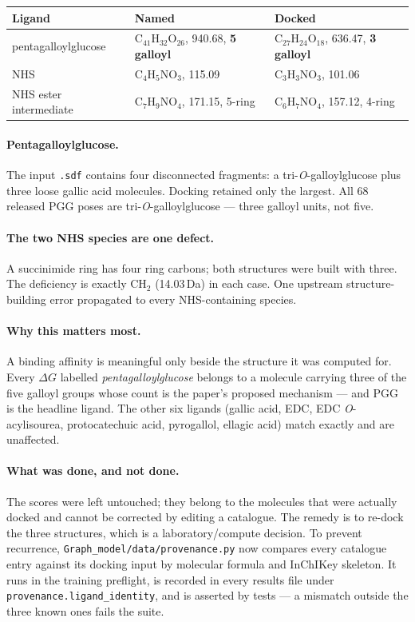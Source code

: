 \documentclass[11pt,a4paper]{article}
\newcommand{\ok}[1]{\textcolor{okgreen}{#1}}
\newcommand{\bad}[1]{\textcolor{badred}{#1}}
\newcommand{\code}[1]{\texttt{\small #1}}
\begin{document}
\begin{center}
\begin{tabular}{@{}lll@{}}
\toprule
\textbf{Ligand} & \textbf{Named} & \textbf{Docked} \\
\midrule
pentagalloylglucose & $\mathrm{C_{41}H_{32}O_{26}}$, 940.68, \textbf{5 galloyl}
  & \bad{$\mathrm{C_{27}H_{24}O_{18}}$, 636.47, \textbf{3 galloyl}} \\
NHS & $\mathrm{C_4H_5NO_3}$, 115.09
  & \bad{$\mathrm{C_3H_3NO_3}$, 101.06} \\
NHS ester intermediate & $\mathrm{C_7H_9NO_4}$, 171.15, 5-ring
  & \bad{$\mathrm{C_6H_7NO_4}$, 157.12, 4-ring} \\
\bottomrule
\end{tabular}
\end{center}

\paragraph{Pentagalloylglucose.} The input \code{.sdf} contains four
disconnected fragments: a tri-\emph{O}-galloylglucose plus three loose gallic
acid molecules. Docking retained only the largest. All 68 released PGG poses
are tri-\emph{O}-galloylglucose --- three galloyl units, not five.

\paragraph{The two NHS species are one defect.} A succinimide ring has four
ring carbons; both structures were built with three. The deficiency is exactly
$\mathrm{CH_2}$ (14.03\,Da) in each case. One upstream structure-building
error propagated to every NHS-containing species.

\paragraph{Why this matters most.} A binding affinity is meaningful only
beside the structure it was computed for. Every $\Delta G$ labelled
\emph{pentagalloylglucose} belongs to a molecule carrying three of the five
galloyl groups whose count is the paper's proposed mechanism --- and PGG is the
headline ligand. The other six ligands (gallic acid, EDC, EDC
\emph{O}-acylisourea, protocatechuic acid, pyrogallol, ellagic acid)
\ok{match exactly} and are unaffected.

\paragraph{What was done, and not done.} The scores were left untouched;
they belong to the molecules that were actually docked and cannot be corrected
by editing a catalogue. The remedy is to re-dock the three structures, which
is a laboratory/compute decision. To prevent recurrence,
\code{Graph\_model/data/provenance.py} now compares every catalogue entry
against its docking input by molecular formula and InChIKey skeleton. It runs
in the training preflight, is recorded in every results file under
\code{provenance.ligand\_identity}, and is asserted by tests --- a mismatch
outside the three known ones fails the suite.
\end{document}
